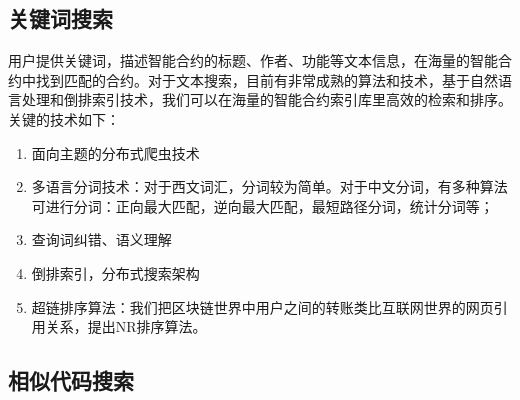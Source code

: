 \subsection{关键词搜索}
用户提供关键词，描述智能合约的标题、作者、功能等文本信息，在海量的智能合约中找到匹配的合约。对于文本搜索，目前有非常成熟的算法和技术，基于自然语言处理和倒排索引技术，我们可以在海量的智能合约索引库里高效的检索和排序。关键的技术如下：
\begin{enumerate}
	\item 面向主题的分布式爬虫技术
	\item 多语言分词技术：对于西文词汇，分词较为简单。对于中文分词，有多种算法可进行分词：正向最大匹配，逆向最大匹配，最短路径分词，统计分词等；
	\item 查询词纠错、语义理解
	\item 倒排索引，分布式搜索架构
	\item 超链排序算法：我们把区块链世界中用户之间的转账类比互联网世界的网页引用关系，提出NR排序算法。
\end{enumerate}


\subsection{相似代码搜索}

